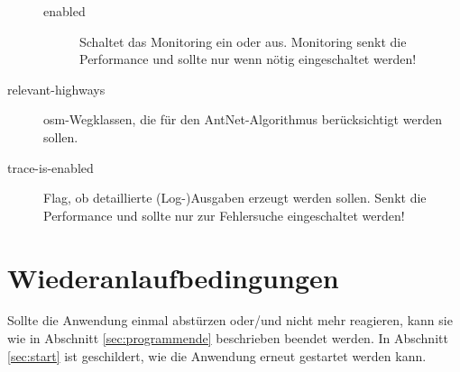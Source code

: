 \begin{description}
\begin{description}
      \item[enabled] Schaltet das Monitoring ein oder aus.
        Monitoring senkt die Performance und sollte nur wenn nötig eingeschaltet werden!
    \end{description}
  \item[relevant-highways] \ac{osm}-Wegklassen, die für den AntNet-Algorithmus berücksichtigt werden sollen.
  \item[trace-is-enabled] Flag, ob detaillierte (Log-)Ausgaben erzeugt werden sollen.
    Senkt die Performance und sollte nur zur Fehlersuche eingeschaltet werden!
\end{description}


\section{Wiederanlaufbedingungen}
\label{sec:wiederanlaufbedingungen}

Sollte die Anwendung einmal abstürzen oder/und nicht mehr reagieren, kann sie wie in Abschnitt \ref{sec:programmende} beschrieben beendet werden.
In Abschnitt \ref{sec:start} ist geschildert, wie die Anwendung erneut gestartet werden kann.
